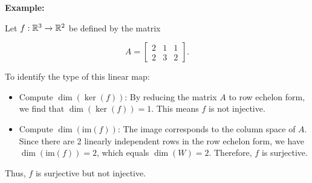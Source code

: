 \textbf{Example:}

Let \( f: \mathbb{R}^3 \to \mathbb{R}^2 \) be defined by the matrix

\[
    A = \begin{bmatrix} 2 & 1 & 1 \\ 2 & 3 & 2 \end{bmatrix}.
\]

To identify the type of this linear map:

\begin{itemize}
    
    \item Compute \( \dim(\ker(f)) \): By reducing the matrix \( A \) to row echelon form, we find that 
    \( \dim(\ker(f)) = 1 \). This means \( f \) is not injective.
    
    \item Compute \( \dim(\text{im}(f)) \): The image corresponds to the column space of \( A \). Since 
    there are 2 linearly independent rows in the row echelon form, we have \( \dim(\text{im}(f)) = 2 \), 
    which equals \( \dim(W) = 2 \). Therefore, \( f \) is surjective.

\end{itemize}

Thus, \( f \) is surjective but not injective.


